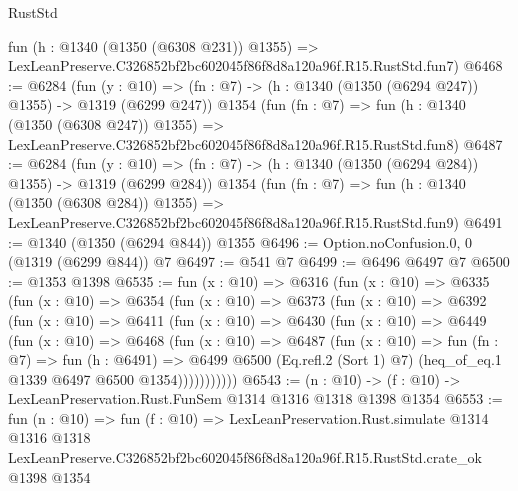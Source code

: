 \begin{lexlean}{RustStd}
\begin{coremodule}
    fun (h : @1340 (@1350 (@6308 @231)) @1355) =>
    LexLeanPreserve.C326852bf2bc602045f86f8d8a120a96f.R15.RustStd.fun7)
@6468 := @6284
    (fun (y : @10) => (fn : @7) -> (h : @1340 (@1350 (@6294 @247)) @1355) -> @1319 (@6299 @247))
    @1354
    (fun (fn : @7) =>
    fun (h : @1340 (@1350 (@6308 @247)) @1355) =>
    LexLeanPreserve.C326852bf2bc602045f86f8d8a120a96f.R15.RustStd.fun8)
@6487 := @6284
    (fun (y : @10) => (fn : @7) -> (h : @1340 (@1350 (@6294 @284)) @1355) -> @1319 (@6299 @284))
    @1354
    (fun (fn : @7) =>
    fun (h : @1340 (@1350 (@6308 @284)) @1355) =>
    LexLeanPreserve.C326852bf2bc602045f86f8d8a120a96f.R15.RustStd.fun9)
@6491 := @1340 (@1350 (@6294 @844)) @1355
@6496 := Option.noConfusion.{0, 0} (@1319 (@6299 @844)) @7
@6497 := @541 @7
@6499 := @6496 @6497 @7
@6500 := @1353 @1398
@6535 := fun (x : @10) =>
  @6316
    (fun (x : @10) =>
    @6335
      (fun (x : @10) =>
      @6354
        (fun (x : @10) =>
        @6373
          (fun (x : @10) =>
          @6392
            (fun (x : @10) =>
            @6411
              (fun (x : @10) =>
              @6430
                (fun (x : @10) =>
                @6449
                  (fun (x : @10) =>
                  @6468
                    (fun (x : @10) =>
                    @6487
                      (fun (x : @10) =>
                      fun (fn : @7) =>
                      fun (h : @6491) =>
                      @6499
                        @6500
                        (Eq.refl.{2} (Sort 1) @7)
                        (heq_of_eq.{1} @1339 @6497 @6500 @1354)))))))))))
@6543 := (n : @10) -> (f : @10) -> LexLeanPreservation.Rust.FunSem @1314 @1316 @1318 @1398 @1354
@6553 := fun (n : @10) =>
  fun (f : @10) =>
  LexLeanPreservation.Rust.simulate
    @1314
    @1316
    @1318
    LexLeanPreserve.C326852bf2bc602045f86f8d8a120a96f.R15.RustStd.crate_ok
    @1398
    @1354
\end{coremodule}
\end{lexlean}
